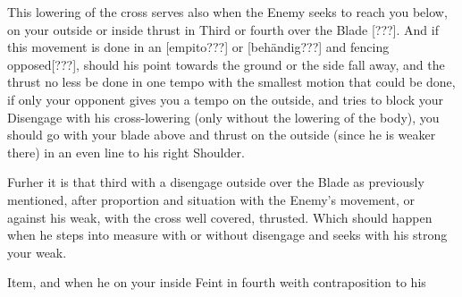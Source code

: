 This lowering of the cross serves also when the Enemy seeks to reach
you below, on your outside or inside thrust in Third or fourth over the
Blade [???]. And if this movement is done in an [empito???] or
[beh{\"a}ndig???] and fencing opposed[???], should his point towards
the ground or the side fall away, and the thrust no less be done in
one tempo with the smallest motion that could be done, if only your
opponent gives you a tempo on the outside, and tries to block your
Disengage with his cross-lowering (only without the lowering of the
body), you should go with your blade above and thrust on the outside
(since he is weaker there) in an even line to his right Shoulder.


Furher it is that third with a disengage outside over the Blade as
previously mentioned, after proportion and situation with the Enemy's
movement, or against his weak, with the cross well covered,
thrusted. Which should happen when he steps into measure with or
without disengage and seeks with his strong your weak.


Item, and when he on your inside Feint in fourth weith contraposition
to his
